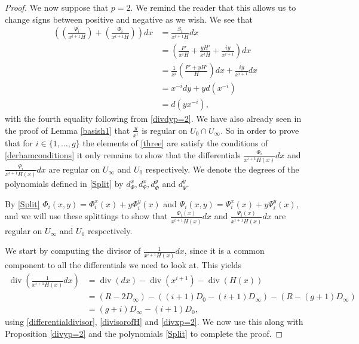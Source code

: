 \documentclass[draft, 11pt]{article} %
\theoremstyle{plain}
\theoremstyle{remark}
\DeclareMathOperator{\di}{div}
\begin{document}
\begin{proof}
We now suppose that $p=2$.
We remind the reader that this allows us to change signs between positive and negative as we wish.
We see that
\begin{align*}
\left( \left( \frac{ \Psi_i}{x^{i+1}H} \right) + \left( \frac{\Phi_i}{x^{i+1}H} \right) \right) dx & =  \frac{S_i}{x^{i+1}H}dx \\
& =  \left( \frac{F'}{x^iH} + \frac{yH'}{x^iH} + \frac{iy}{x^{i+1}} \right) dx \\
& =  \frac{1}{x^i}\left( \frac{F' + yH'}{H} \right) dx + \frac{iy}{x^{i+1}}dx \\
& =  x^{-i}dy + yd \left( x^{-i}\right) \\
& =  d\left( yx^{-i}\right),
\end{align*}
with the fourth equality following from \eqref{divdyp=2}.
We have also already seen in the proof of Lemma \ref{basish1} that $\frac{y}{x^i}$ is regular on $U_0 \cap U_\infty$.
So in order to prove that for $i\in \{1, \ldots, g\}$ the elements of \eqref{three} are satisfy the conditions of \eqref{derhamconditions} it only remains to show that the differentials $\frac{\Phi_i}{x^{i+1}H(x)}dx$ and $\frac{\Psi_i}{x^{i+1}H(x)}dx$ are regular on $U_\infty$ and $U_0$ respectively.
We denote the degrees of the polynomials defined in \eqref{Split} by $d_{\Phi}^x, d_{\Psi}^x, d_{\Phi}^y$ and $d_{\Psi}^y$.


By \eqref{Split} $\Phi_i(x,y) = \Phi_i^x(x) + y\Phi_i^y(x)$ and $\Psi_i (x,y)= \Psi_i^x(x) + y\Psi_i^y(x)$, and we will use these splittings to show that $\frac{ \Phi_i(x) }{x^{i+1}H(x)}dx$ and $\frac{\Psi_i(x) }{x^{i+1}H(x)}dx$ are regular on $U_\infty$ and $U_0$ respectively.

We start by computing the divisor of $\frac{1}{x^{i+1}H(x)}dx$, since it is a common component to all the differentials we need to look at.
This yields
\begin{align*}
\di \left( \frac{1}{x^{i+1}H(x)}dx \right) & = \di(dx) - \di (x^{i+1}) - \di (H(x)) \nonumber \\
& = (R-2D_\infty) - ((i+1)D_0 - (i+1)D_\infty) - (R - (g+1)D_\infty) \nonumber \\
& = (g+i)D_\infty - (i+1)D_0,
\end{align*}
using \eqref{differentialdivisor}, \eqref{divisorofH} and \eqref{divxp=2}.
We now use this along with Proposition \ref{divyp=2} and the polynomials \eqref{Split} to complete the proof.


\end{proof}
\end{document}

